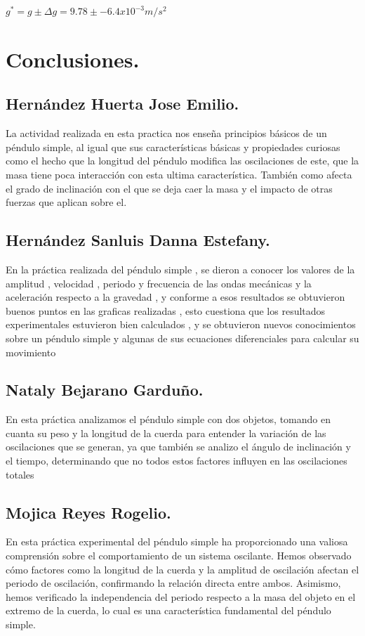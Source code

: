 \documentclass[10pt]{article}
\begin{document}
\begin{multicols}{2}
$g^{*}=g\pm \Delta g=9.78 \pm -6.4x10^{-3}  m/s^2$  \\

\section{Conclusiones.}
\subsection{Hernández Huerta Jose Emilio.}
La actividad realizada en esta practica nos enseña principios básicos de un péndulo simple, al igual que sus características básicas  y propiedades curiosas como el hecho que la longitud del péndulo modifica las oscilaciones de este, que la masa tiene poca interacción con esta ultima característica. También como afecta el grado de inclinación con el que se deja caer la masa y el impacto de otras fuerzas que aplican sobre el. 
\subsection{Hernández Sanluis Danna Estefany.}
En la práctica realizada del péndulo simple , se dieron a conocer los valores de la amplitud  , velocidad , periodo y frecuencia de las ondas mecánicas y la aceleración respecto a la gravedad  , y conforme a esos resultados se obtuvieron buenos puntos en las graficas realizadas , esto cuestiona que los resultados experimentales estuvieron bien calculados , y se obtuvieron nuevos conocimientos sobre un péndulo simple y algunas de sus ecuaciones diferenciales para calcular su movimiento
\subsection{Nataly Bejarano Garduño.}
En esta práctica analizamos el péndulo simple con dos objetos, tomando en cuanta su peso y la longitud de la cuerda para entender la variación de las oscilaciones que se generan, ya que también se analizo el ángulo de inclinación y el tiempo, determinando que no todos estos factores influyen en las oscilaciones totales
\subsection{Mojica Reyes Rogelio.}
En esta práctica experimental del péndulo simple ha proporcionado una valiosa comprensión sobre el comportamiento de un sistema oscilante. Hemos observado cómo factores como la longitud de la cuerda y la amplitud de oscilación afectan el periodo de oscilación, confirmando la relación directa entre ambos. Asimismo, hemos verificado la independencia del periodo respecto a la masa del objeto en el extremo de la cuerda, lo cual es una característica fundamental del péndulo simple.

\end{multicols}
\end{document}
